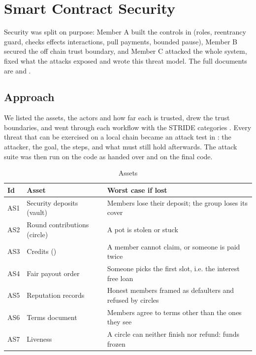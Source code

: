 \section{Smart Contract Security}
\label{sec:security}

Security was split on purpose: Member A built the controls in (roles, reentrancy guard, checks
effects interactions, pull payments, bounded pause), Member B secured the off chain trust boundary,
and Member C attacked the whole system, fixed what the attacks exposed and wrote this threat model.
The full documents are  and .

\subsection{Approach}
We listed the assets, the actors and how far each is trusted, drew the trust boundaries, and went
through each workflow with the STRIDE categories \cite{shostack2014}. Every threat that can be exercised
on a local chain became an attack test in : the attacker, the goal, the steps, and
what must still hold afterwards. The attack suite was then run on the code as handed over and on the
final code.

\begin{table}[H]
\centering\small
\caption{Assets}
\label{tab:assets}
\begin{tabularx}{\textwidth}{@{}P{0.9cm}P{4.2cm}L@{}}
\toprule
Id & Asset & Worst case if lost \\
\midrule
AS1 & Security deposits (vault) & Members lose their deposit; the group loses its cover \\
AS2 & Round contributions (circle) & A pot is stolen or stuck \\
AS3 & Credits () & A member cannot claim, or someone is paid twice \\
AS4 & Fair payout order & Someone picks the first slot, i.e. the interest free loan \\
AS5 & Reputation records & Honest members framed as defaulters and refused by circles \\
AS6 & Terms document & Members agree to terms other than the ones they see \\
AS7 & Liveness & A circle can neither finish nor refund: funds frozen \\
\bottomrule
\end{tabularx}
\end{table}

